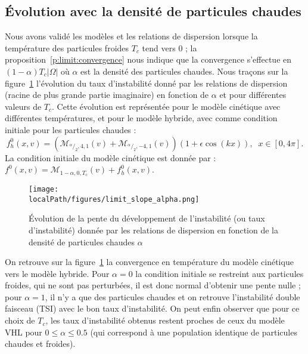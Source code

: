 \FloatBarrier
\subsection{Évolution avec la densité de particules chaudes}

Nous avons validé les modèles et les relations de dispersion lorsque la température des particules froides $T_c$ tend vers $0$ ; la proposition~\ref{p:limit:convergence} nous indique que la convergence s'effectue en $(1-\alpha)T_c|\Omega|$ où $\alpha$ est la densité des particules chaudes. Nous traçons sur la figure~\ref{fig:limit:slope:alpha} l'évolution du taux d'instabilité donné par les relations de dispersion (racine de plus grande partie imaginaire) en fonction de $\alpha$ et pour différentes valeurs de $T_c$. Cette évolution est représentée pour le modèle cinétique avec différentes températures, et  pour le modèle hybride, avec comme condition initiale pour les particules chaudes :
$$
  f_h^0(x,v) = \left(\mathcal{M}_{^\alpha/_2,4,1}(v) + \mathcal{M}_{^\alpha/_2,-4,1}(v)\right)(1+\epsilon\cos\left(k x\right)), \;\; x\in [0, 4\pi]. 
$$
La condition initiale du modèle cinétique est donnée par : $f^0(x,v) = \mathcal{M}_{1-\alpha,0,T_c}(v) + f_h^0(x,v)$.
\begin{figure}[h!]
  \centering
  \texttt{[image: \\localPath/figures/limit\_slope\_alpha.png]}
  \caption{Évolution de la pente du développement de l'instabilité (ou taux d'instabilité) donnée par les relations de dispersion en fonction de la densité de particules chaudes $\alpha$}
  \label{fig:limit:slope:alpha}
\end{figure}
On retrouve sur la figure~\ref{fig:limit:slope:alpha} la convergence en température du modèle cinétique vers le modèle hybride. Pour $\alpha=0$ la condition initiale se restreint aux particules froides, qui ne sont pas perturbées, il est donc normal d'obtenir une pente nulle ; pour $\alpha=1$, il n'y a que des particules chaudes et on retrouve l'instabilité double faisceau (TSI) avec le bon taux d'instabilité. On peut enfin observer que pour ce choix de $T_c$, les taux d'instabilité obtenus restent proches de ceux du modèle VHL pour $0\leq \alpha \leq 0.5$ (qui correspond à une population identique de particules chaudes et froides).

\FloatBarrier
